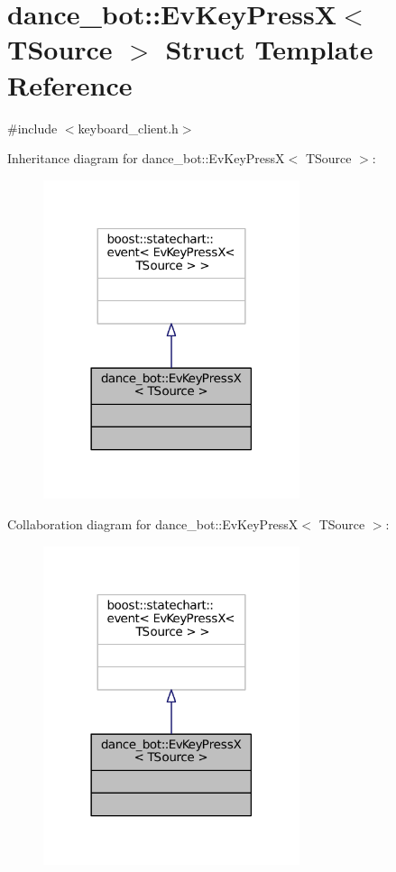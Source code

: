 \hypertarget{structdance__bot_1_1EvKeyPressX}{}\section{dance\+\_\+bot\+:\+:Ev\+Key\+PressX$<$ T\+Source $>$ Struct Template Reference}
\label{structdance__bot_1_1EvKeyPressX}


{\ttfamily \#include $<$keyboard\+\_\+client.\+h$>$}



Inheritance diagram for dance\+\_\+bot\+:\+:Ev\+Key\+PressX$<$ T\+Source $>$\+:
\nopagebreak
\begin{figure}[H]
\begin{center}
\leavevmode
\includegraphics[width=213pt]{structdance__bot_1_1EvKeyPressX__inherit__graph}
\end{center}
\end{figure}


Collaboration diagram for dance\+\_\+bot\+:\+:Ev\+Key\+PressX$<$ T\+Source $>$\+:
\nopagebreak
\begin{figure}[H]
\begin{center}
\leavevmode
\includegraphics[width=213pt]{structdance__bot_1_1EvKeyPressX__coll__graph}
\end{center}
\end{figure}


